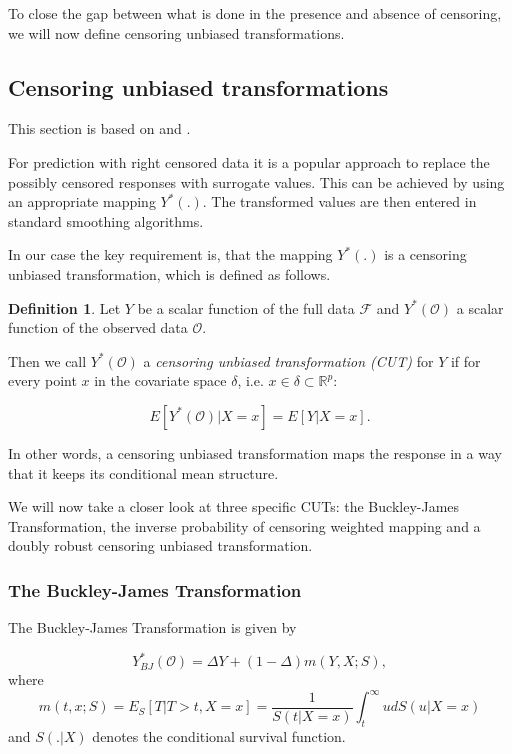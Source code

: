 \documentclass[12pt, a4paper]{article}
\theoremstyle{definition}
\newtheorem{Definition}{Definition}[section]
\theoremstyle{plain}
\numberwithin{equation}{section}
\numberwithin{figure}{section}
\numberwithin{table}{section}
\begin{document}
	To close the gap between what is done in the presence and absence of censoring, we will now define censoring unbiased transformations.
	
	\subsection{Censoring unbiased transformations}
	This section is based on \citet*{culs} and \citet*{drcut}.
	
	For prediction with right censored data it is a popular approach to replace the possibly censored responses with surrogate values.
	This can be achieved by using an appropriate mapping $Y^*(.)$.
	The transformed values are then entered in standard smoothing algorithms.
	
	In our case the key requirement is, that the mapping $Y^*(.)$ is a censoring unbiased transformation, which is defined as follows.
	
	\begin{Definition}
	Let $Y$ be a scalar function of the full data $\mathcal{F}$ and $Y^*(\mathcal{O})$ a scalar function of the observed data $\mathcal{O}$.
	
	Then we call $Y^*(\mathcal{O})$ a \textit{censoring unbiased transformation (CUT)} for $Y$ if for every point $x$ in the covariate space $\delta$, i.e. $x \in \delta \subset \mathbb{R}^p$:

	\begin{equation*}
	E[Y^*(\mathcal{O}) \vert X = x] = E[Y \vert X=x].
	\end{equation*}
	\end{Definition}

	In other words, a censoring unbiased transformation maps the response in a way that it keeps its conditional mean structure.
	
	We will now take a closer look at three specific CUTs: the Buckley-James Transformation, the inverse probability of censoring weighted mapping and a doubly robust censoring unbiased transformation.
	
	\subsubsection{The Buckley-James Transformation}
	
	\citet*{drcut}
	
	The Buckley-James Transformation is given by
	
	\begin{equation}\label{eq:bjtrafo}
		Y_{BJ}^* (\mathcal{O}) = \Delta Y + (1-\Delta)m(Y,X;S),
	\end{equation}
	where
	\begin{equation}\label{eq:condmean}
		m(t,x;S) = E_S[T \vert T > t, X=x] = \frac{1}{S(t\vert X=x)} \int_t^{\infty} u dS(u\vert X=x)
	\end{equation}
	and $S(.\vert X)$ denotes the conditional survival function.
	
\end{document}
